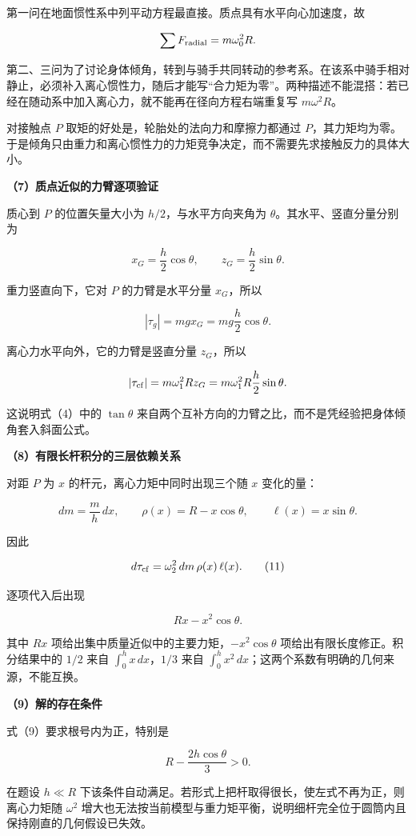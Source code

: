 \documentclass[12pt,a4paper,UTF8]{ctexart}
\begin{document}
第一问在地面惯性系中列平动方程最直接。质点具有水平向心加速度，故

\[
\sum F_{\rm radial}=m\omega_0^2R.
\]

第二、三问为了讨论身体倾角，转到与骑手共同转动的参考系。在该系中骑手相对静止，必须补入离心惯性力，随后才能写``合力矩为零''。两种描述不能混搭：若已经在随动系中加入离心力，就不能再在径向方程右端重复写
\(m\omega^2R\)。

对接触点 \(P\) 取矩的好处是，轮胎处的法向力和摩擦力都通过
\(P\)，其力矩均为零。于是倾角只由重力和离心惯性力的力矩竞争决定，而不需要先求接触反力的具体大小。

\textbf{（7）质点近似的力臂逐项验证}

质心到 \(P\) 的位置矢量大小为 \(h/2\)，与水平方向夹角为
\(\theta\)。其水平、竖直分量分别为

\[
x_G=\frac h2\cos\theta,
\qquad
z_G=\frac h2\sin\theta.
\tag{10}
\]

重力竖直向下，它对 \(P\) 的力臂是水平分量 \(x_G\)，所以

\[
|\tau_g|=mgx_G=mg\frac h2\cos\theta.
\]

离心力水平向外，它的力臂是竖直分量 \(z_G\)，所以

\[
|\tau_{\rm cf}|=m\omega_1^2Rz_G
=m\omega_1^2R\frac h2\sin\theta.
\]

这说明式（4）中的 \(\tan\theta\)
来自两个互补方向的力臂之比，而不是凭经验把身体倾角套入斜面公式。

\textbf{（8）有限长杆积分的三层依赖关系}

对距 \(P\) 为 \(x\) 的杆元，离心力矩中同时出现三个随 \(x\) 变化的量：

\[
dm=\frac mh\,dx,
\qquad
\rho(x)=R-x\cos\theta,
\qquad
\ell(x)=x\sin\theta.
\]

因此

\[
d\tau_{\rm cf}
=\omega_2^2\,dm\,\rho(x)\,\ell(x).
\tag{11}
\]

逐项代入后出现

\[
Rx-x^2\cos\theta.
\]

其中 \(Rx\) 项给出集中质量近似中的主要力矩，\(-x^2\cos\theta\)
项给出有限长度修正。积分结果中的 \(1/2\) 来自
\(\int_0^h x\,dx\)，\(1/3\) 来自
\(\int_0^h x^2\,dx\)；这两个系数有明确的几何来源，不能互换。

\textbf{（9）解的存在条件}

式（9）要求根号内为正，特别是

\[
R-\frac{2h\cos\theta}{3}>0.
\tag{12}
\]

在题设 \(h\ll R\)
下该条件自动满足。若形式上把杆取得很长，使左式不再为正，则离心力矩随
\(\omega^2\)
增大也无法按当前模型与重力矩平衡，说明细杆完全位于圆筒内且保持刚直的几何假设已失效。
\end{document}
